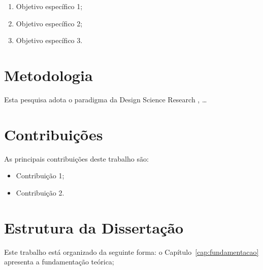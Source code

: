 \begin{enumerate}
  \item Objetivo específico 1;
  \item Objetivo específico 2;
  \item Objetivo específico 3.
\end{enumerate}

\section{Metodologia}
\label{sec:metodologia-intro}

Esta pesquisa adota o paradigma da Design Science Research
\cite{Hevner2004}, \ldots

\section{Contribuições}
\label{sec:contribuicoes}

As principais contribuições deste trabalho são:

\begin{itemize}
  \item Contribuição 1;
  \item Contribuição 2.
\end{itemize}

\section{Estrutura da Dissertação}
\label{sec:estrutura}

Este trabalho está organizado da seguinte forma:
o Capítulo~\ref{cap:fundamentacao} apresenta a fundamentação teórica;
